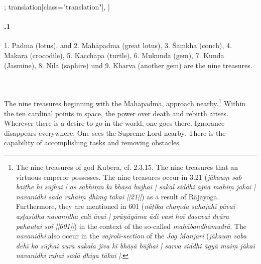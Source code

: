 \begin{alignment}[
  texts=edition[class="edition"];
  translation[class="translation"],
  ]
\begin{translation}
\begin{tlate}[42_1]
      \paragraph{.1 }  1. Padma (lotus), and 2. Mahāpadma (great lotus), 3. Śaṃkha (conch), 4. Makara (crocodile), 5. Kacchapa (turtle), 6. Mukunda (gem), 7. Kunda (Jasmine), 8. Nīla (saphire) und 9. Kharva (another gem) are the nine treasures.
    \end{tlate}
    \begin{tlate}[p42_03]
     \\\\ The nine treasures beginning with the Mahāpadma, approach nearby.\footnote{The nine treasures of god Kubera, cf.  2.3.15. The nine treasures that an virtuous emperor possesses. The nine treasures occur in  3.21 (\textit{jākauṃ sab baiṭhe hī sūjhai | as sabhiṃn kī bhāṣā būjhai | sakal siddhi ājñā mahiṃ jākai | navanidhi sadā rahaiṃ ḍhiṃg tākai ||21||}) as a result of Rājayoga. Furthermore, they are mentioned in  601 (\textit{nāṭika chaṃda sahajahī pāvai aṣṭasidha navanidha cali āvai | prāṇāyāma ādi vasi hoī dasavai dvāra pahautai soī ||601||}) in the context of the so-called \textit{mahābandhamudrā}. The \textit{navanidhi} also occur in the \textit{vajrolī-section} of the \textit{Jog Manjarī} (\textit{jākauṃ saba dehī ko sūjhai aura sakala jīva kī bhāṣā būjhai | sarva siddhi āgyā maiṃ jākai navanidhi rahai sadā ḍhiga tākai |}.} 
      Within the ten cardinal points in space, the power over death and rebirth arises. Wherever there is a desire to go in the world, one goes there. Ignorance disappears everywhere. One sees the Supreme Lord nearby. There is the capability of accomplishing tasks and removing obstacles.
      \flushpage
    \end{tlate}
  \end{translation}
\end{alignment}
\pagebreak %
